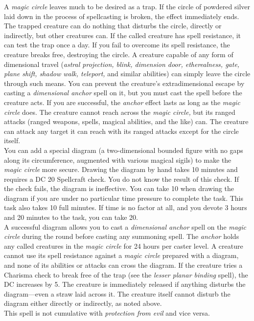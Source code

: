A \textit{magic circle }leaves much to be desired as a trap. If the circle of powdered silver laid down in the process of spellcasting is broken, the effect immediately ends. The trapped creature can do nothing that disturbs the circle, directly or indirectly, but other creatures can. If the called creature has spell resistance, it can test the trap once a day. If you fail to overcome its spell resistance, the creature breaks free, destroying the circle. A creature capable of any form of dimensional travel (\textit{astral projection, blink, dimension door, etherealness, gate, plane shift, shadow walk, teleport, }and similar abilities) can simply leave the circle through such means. You can prevent the creature's extradimensional escape by casting a \textit{dimensional anchor }spell on it, but you must cast the spell before the creature acts. If you are successful, the \textit{anchor }effect lasts as long as the \textit{magic circle }does. The creature cannot reach across the \textit{magic circle, }but its ranged attacks (ranged weapons, spells, magical abilities, and the like) can. The creature can attack any target it can reach with its ranged attacks except for the circle itself.\\
You can add a special diagram (a two-dimensional bounded figure with no gaps along its circumference, augmented with various magical sigils) to make the \textit{magic circle }more secure. Drawing the diagram by hand takes 10 minutes and requires a DC 20 Spellcraft check. You do not know the result of this check. If the check fails, the diagram is ineffective. You can take 10 when drawing the diagram if you are under no particular time pressure to complete the task. This task also takes 10 full minutes. If time is no factor at all, and you devote 3 hours and 20 minutes to the task, you can take 20.\\
A successful diagram allows you to cast a \textit{dimensional anchor }spell on the \textit{magic circle }during the round before casting any summoning spell. The \textit{anchor }holds any called creatures in the \textit{magic circle }for 24 hours per caster level. A creature cannot use its spell resistance against a \textit{magic circle }prepared with a diagram, and none of its abilities or attacks can cross the diagram. If the creature tries a Charisma check to break free of the trap (see the \textit{lesser planar binding }spell), the DC increases by 5. The creature is immediately released if anything disturbs the diagram---even a straw laid across it. The creature itself cannot disturb the diagram either directly or indirectly, as noted above.\\
This spell is not cumulative with \textit{protection from evil }and vice versa.\\
